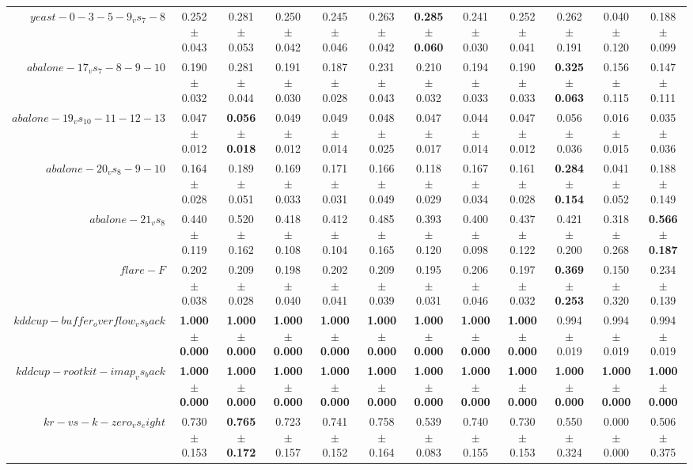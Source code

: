 \begin{table}[!ht]
{\begin{tabular}{r c c c c c c c c c c c}
$yeast-0-3-5-9_vs_7-8$ & 0.252 $\pm$ 0.043 & 0.281 $\pm$ 0.053 & 0.250 $\pm$ 0.042 & 0.245 $\pm$ 0.046 & 0.263 $\pm$ 0.042 & \textbf{0.285 $\pm$ 0.060} & 0.241 $\pm$ 0.030 & 0.252 $\pm$ 0.041 & 0.262 $\pm$ 0.191 & 0.040 $\pm$ 0.120 & 0.188 $\pm$ 0.099 \\
$abalone-17_vs_7-8-9-10$ & 0.190 $\pm$ 0.032 & 0.281 $\pm$ 0.044 & 0.191 $\pm$ 0.030 & 0.187 $\pm$ 0.028 & 0.231 $\pm$ 0.043 & 0.210 $\pm$ 0.032 & 0.194 $\pm$ 0.033 & 0.190 $\pm$ 0.033 & \textbf{0.325 $\pm$ 0.063} & 0.156 $\pm$ 0.115 & 0.147 $\pm$ 0.111 \\
$abalone-19_vs_10-11-12-13$ & 0.047 $\pm$ 0.012 & \textbf{0.056 $\pm$ 0.018} & 0.049 $\pm$ 0.012 & 0.049 $\pm$ 0.014 & 0.048 $\pm$ 0.025 & 0.047 $\pm$ 0.017 & 0.044 $\pm$ 0.014 & 0.047 $\pm$ 0.012 & 0.056 $\pm$ 0.036 & 0.016 $\pm$ 0.015 & 0.035 $\pm$ 0.036 \\
$abalone-20_vs_8-9-10$ & 0.164 $\pm$ 0.028 & 0.189 $\pm$ 0.051 & 0.169 $\pm$ 0.033 & 0.171 $\pm$ 0.031 & 0.166 $\pm$ 0.049 & 0.118 $\pm$ 0.029 & 0.167 $\pm$ 0.034 & 0.161 $\pm$ 0.028 & \textbf{0.284 $\pm$ 0.154} & 0.041 $\pm$ 0.052 & 0.188 $\pm$ 0.149 \\
$abalone-21_vs_8$ & 0.440 $\pm$ 0.119 & 0.520 $\pm$ 0.162 & 0.418 $\pm$ 0.108 & 0.412 $\pm$ 0.104 & 0.485 $\pm$ 0.165 & 0.393 $\pm$ 0.120 & 0.400 $\pm$ 0.098 & 0.437 $\pm$ 0.122 & 0.421 $\pm$ 0.200 & 0.318 $\pm$ 0.268 & \textbf{0.566 $\pm$ 0.187} \\
$flare-F$ & 0.202 $\pm$ 0.038 & 0.209 $\pm$ 0.028 & 0.198 $\pm$ 0.040 & 0.202 $\pm$ 0.041 & 0.209 $\pm$ 0.039 & 0.195 $\pm$ 0.031 & 0.206 $\pm$ 0.046 & 0.197 $\pm$ 0.032 & \textbf{0.369 $\pm$ 0.253} & 0.150 $\pm$ 0.320 & 0.234 $\pm$ 0.139 \\
$kddcup-buffer_overflow_vs_back$ & \textbf{1.000 $\pm$ 0.000} & \textbf{1.000 $\pm$ 0.000} & \textbf{1.000 $\pm$ 0.000} & \textbf{1.000 $\pm$ 0.000} & \textbf{1.000 $\pm$ 0.000} & \textbf{1.000 $\pm$ 0.000} & \textbf{1.000 $\pm$ 0.000} & \textbf{1.000 $\pm$ 0.000} & 0.994 $\pm$ 0.019 & 0.994 $\pm$ 0.019 & 0.994 $\pm$ 0.019 \\
$kddcup-rootkit-imap_vs_back$ & \textbf{1.000 $\pm$ 0.000} & \textbf{1.000 $\pm$ 0.000} & \textbf{1.000 $\pm$ 0.000} & \textbf{1.000 $\pm$ 0.000} & \textbf{1.000 $\pm$ 0.000} & \textbf{1.000 $\pm$ 0.000} & \textbf{1.000 $\pm$ 0.000} & \textbf{1.000 $\pm$ 0.000} & \textbf{1.000 $\pm$ 0.000} & \textbf{1.000 $\pm$ 0.000} & \textbf{1.000 $\pm$ 0.000} \\
$kr-vs-k-zero_vs_eight$ & 0.730 $\pm$ 0.153 & \textbf{0.765 $\pm$ 0.172} & 0.723 $\pm$ 0.157 & 0.741 $\pm$ 0.152 & 0.758 $\pm$ 0.164 & 0.539 $\pm$ 0.083 & 0.740 $\pm$ 0.155 & 0.730 $\pm$ 0.153 & 0.550 $\pm$ 0.324 & 0.000 $\pm$ 0.000 & 0.506 $\pm$ 0.375 \\

\end{tabular}}
\end{table}

